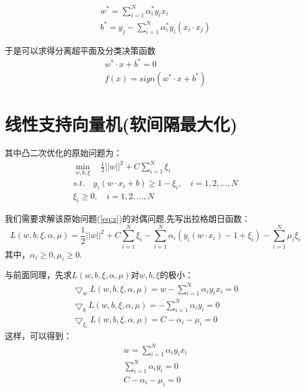 \documentclass{article}
\begin{document}
\begin{gather}
    w^*=\sum_{i=1}^{N}\alpha_i^* y_i x_i\\
    b^*=y_j-\sum_{i=1}^{N}\alpha_i^* y_i(x_i\cdot x_j)
\end{gather}

于是可以求得分离超平面及分类决策函数
\begin{gather}
    w^*\cdot x+b^*=0\\
    f(x)=sign(w^*\cdot x+b^*)
\end{gather}

\section{线性支持向量机(软间隔最大化)}
其中凸二次优化的原始问题为：
\begin{gather}  \label{eq:z}
    \min\limits_{w,b,\xi} \quad \frac{1}{2}||w||^2+C\sum_{i=1}^{N}\xi_i\\
    s.t.\quad y_i(w\cdot x_i+b)\ge1-\xi_i,\quad i=1,2,\dots,N\\
    \xi_i\ge0,\quad i=1,2,\dots,N
\end{gather}

我们需要求解该原始问题(\ref{eq:z})的对偶问题,先写出拉格朗日函数：
\begin{equation}  \label{eq:ll}
    L(w,b,\xi,\alpha,\mu)=\frac{1}{2}||w||^2+C\sum_{i=1}^{N}\xi_i-\sum_{i=1}^{N}\alpha_i(y_i(w\cdot x_i)-1+\xi_i)-\sum_{i=1}^{N}\mu_i\xi_i
\end{equation}
其中，$\alpha_i\ge0,\mu_i\ge0$.

与前面同理，先求$L(w,b,\xi,\alpha,\mu)$对$w,b,\xi$的极小：
\begin{gather}
    \bigtriangledown_w L(w,b,\xi,\alpha,\mu)=w-\sum_{i=1}^{N}\alpha_i y_i x_i=0\\
    \bigtriangledown_b L(w,b,\xi,\alpha,\mu)=-\sum_{i=1}^{N}\alpha_i y_i=0 \\
    \bigtriangledown_{\xi_i} L(w,b,\xi,\alpha,\mu)=C-\alpha_i -\mu_i=0
\end{gather}
这样，可以得到：
\begin{gather}
    w=\sum_{i=1}^{N}\alpha_i y_i x_i \label{eq:d1}\\ 
    \sum_{i=1}^{N}\alpha_i y_i=0 \label{eq:d2}\\
    C-\alpha_i-\mu_i=0 \label{eq:d3}
\end{gather}
\end{document}
